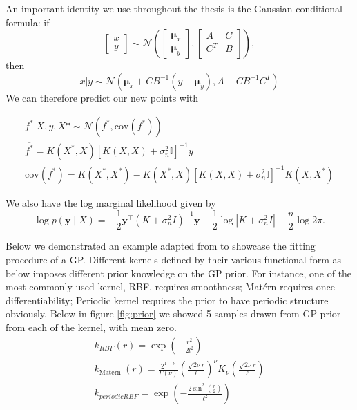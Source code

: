 \documentclass{statsmsc}
\begin{document}
An important identity we use throughout the thesis is the Gaussian conditional formula: if
$$
  \begin{bmatrix}
    x\\y
  \end{bmatrix} 
  \sim \mathcal{N}
  \left(
    \begin{bmatrix}
      \mathbf{\mu}_x\\
      \mathbf{\mu}_y
    \end{bmatrix},
    \begin{bmatrix}
      A & C \\
      C^T & B\\
    \end{bmatrix}
  \right), 
$$ 
then 
\begin{equation}
  x|y\sim \mathcal{N}\left(\mathbf{\mu}_x+CB^{-1}(y-\mathbf{\mu}_y),A-CB^{-1}C^T\right)
  \label{equ:normal_condtion}
\end{equation}
We can therefore predict our new points with 

\begin{equation*}
\begin{gathered}
f^*|X, y, X* \sim \mathcal{N} \left(\overline{f^*}, \mathrm{cov}(f^*)\right)\\ 
\overline{f^*} = K(X^*, X)[K(X,X)+\sigma^2_n\mathbb{I}]^{-1}y\\
\mathrm{cov}(f^*) = K(X^*, X^*) - K(X^*, X)[K(X, X)+\sigma^2_n\mathbb{I}]^{-1}K(X, X^*)
\end{gathered}
\end{equation*}

We also have the log marginal likelihood given by 
$$
\log p(\mathbf{y} \mid X)=-\frac{1}{2} \mathbf{y}^{\top}\left(K+\sigma_{n}^{2} I\right)^{-1} \mathbf{y}-\frac{1}{2} \log \left|K+\sigma_{n}^{2} I\right|-\frac{n}{2} \log 2 \pi.
$$

Below we demonstrated an example adapted from \cite{GPflow2017} to showcase the fitting procedure of a GP.
Different kernels defined by their various functional form as below imposes different prior knowledge on the GP prior.
For instance, one of the most commonly used kernel, RBF, requires smoothness; Matérn requires once differentiability; Periodic kernel requires the prior to have periodic structure obviously.
Below in figure \ref{fig:prior} we showed 5 samples drawn from GP prior from each of the kernel, with mean zero.
\begin{equation*}
  \begin{gathered}
    k_{RBF}(r) = \exp(-\frac{r^2}{2l^2}) \\
    k_{\text {Matern }}(r)=\frac{2^{1-\nu}}{\Gamma(\nu)}\left(\frac{\sqrt{2 \nu} r}{\ell}\right)^{\nu} K_{\nu}\left(\frac{\sqrt{2 \nu} r}{\ell}\right) \\
    k_{periodic RBF}=\exp \left(-\frac{2 \sin ^{2}\left(\frac{r}{2}\right)}{\ell^{2}}\right)
  \end{gathered}
\end{equation*}
\end{document}
